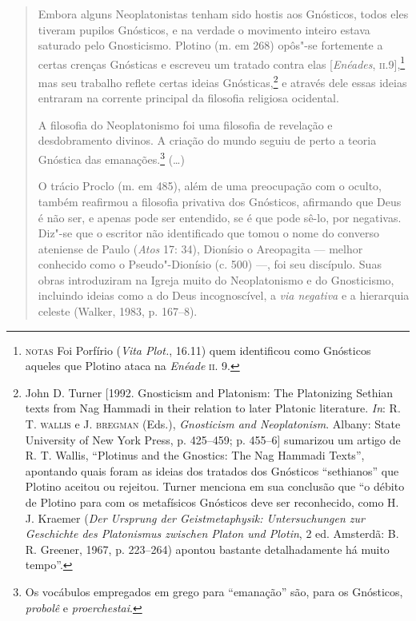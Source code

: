 \begin{quote}
Embora alguns Neoplatonistas tenham sido hostis aos Gnósticos,
todos eles tiveram pupilos Gnósticos, e na verdade o movimento
inteiro estava saturado pelo Gnosticismo. Plotino (m. em 268)
opôs"-se fortemente a certas crenças Gnósticas e escreveu um
tratado contra elas [\emph{Enéades},
\textsc{ii}.9],\footnote{\textsc{notas} 
Foi Porfírio (\emph{Vita Plot.}, 16.11) quem identificou como
Gnósticos aqueles que Plotino ataca na \emph{Enéade} \textsc{ii}. 9.}
mas seu trabalho reflete certas ideias Gnósticas,\footnote{ John
D. Turner [1992. Gnosticism and Platonism: The Platonizing
Sethian texts from Nag Hammadi in their relation to later
Platonic literature. \emph{In}: R. T. \textsc{wallis} e J.
\textsc{bregman}
(Eds.), \textit{Gnosticism and Neoplatonism}. Albany: State
University of New York Press, p. 425--459; p. 455--6] sumarizou um
artigo de R. T. Wallis, “Plotinus and the Gnostics: The Nag
Hammadi Texts”, apontando quais foram as ideias dos tratados dos
Gnósticos “sethianos” que Plotino aceitou ou rejeitou. Turner
menciona em sua conclusão que “o débito de Plotino para com os
metafísicos Gnósticos deve ser reconhecido, como H. J. Kraemer
(\textit{Der Ursprung der Geistmetaphysik: Untersuchungen zur
Geschichte des Platonismus zwischen Platon und Plotin}, 2 ed.
Amsterdã: B. R. Greener, 1967, p. 223--264) apontou bastante
detalhadamente há muito tempo”.} e através dele essas ideias
entraram na corrente principal da filosofia religiosa ocidental.

A filosofia do Neoplatonismo foi uma filosofia de revelação e
desdobramento divinos. A criação do mundo seguiu de perto a
teoria Gnóstica das emanações.\footnote{ Os vocábulos empregados
em grego para “emanação” são, para os Gnósticos,
\emph{probolê} e \emph{proerchestai}.} (\ldots{})

O trácio Proclo (m. em 485), além de uma preocupação com o
oculto, também reafirmou a filosofia privativa dos Gnósticos,
afirmando que Deus é não ser, e apenas pode ser entendido, se é
que pode sê-lo, por negativas. Diz"-se que o escritor
não identificado que tomou o nome do converso ateniense de Paulo
(\emph{Atos} 17: 34), Dionísio o Areopagita --- melhor conhecido
como o Pseudo"-Dionísio (c. 500) ---, foi seu discípulo. Suas obras
introduziram na Igreja muito do Neoplatonismo e do Gnosticismo,
incluindo ideias como a do Deus incognoscível, a \emph{via
negativa} e a hierarquia celeste (Walker, 1983, p. 167--8). 
\end{quote}

